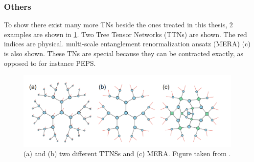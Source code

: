 \subsubsection{Others}

To show there exist many more \Glspl{TN} beside the ones treated in this thesis, 2 examples are shown in \cref{fig:tnalgs:ttn_mera}. Two Tree Tensor Networks (TTNs)  are shown. The red indices are physical. multi-scale entanglement renormalization ansatz (MERA) (c) is also shown. These \Glspl{TN} are special because they can be contracted exactly, as opposed to for instance \Gls{PEPS}.

\begin{figure}[!htbp]
    \center
    \includegraphics[width=0.8 \textwidth]{Figuren/tnalgs/tnns_and_mera.png}
    \caption{ (a) and (b) two different TTNSs and (c) MERA. Figure taken from \cite{Ran2020}.  }
    \label{fig:tnalgs:ttn_mera}
\end{figure}

